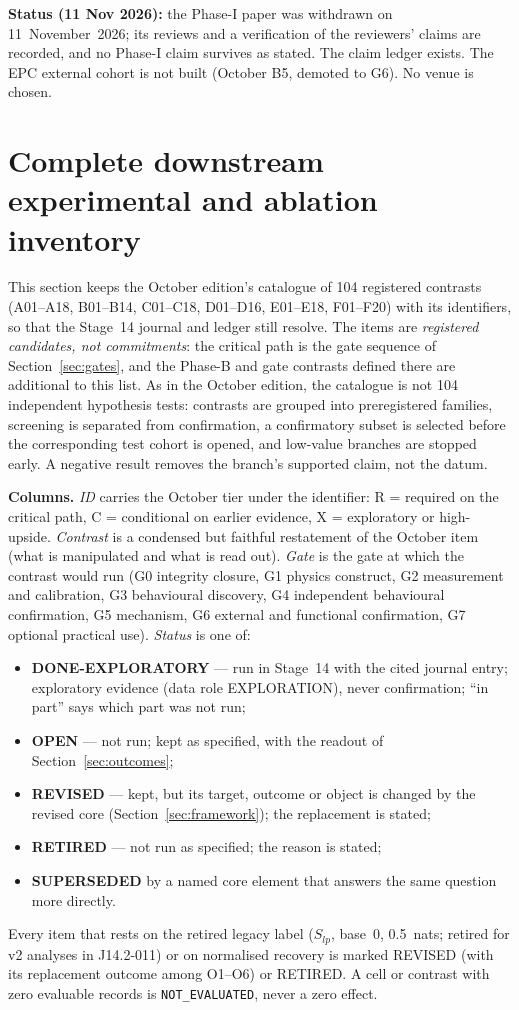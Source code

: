 \documentclass[10pt,a4paper]{article}
\newcommand{\NE}{\texttt{NOT\_EVALUATED}}
\begin{document}
\textbf{Status (11 Nov 2026):} the Phase-I paper was withdrawn on 11~November~2026; its reviews and a verification of
the reviewers' claims are recorded, and no Phase-I claim survives as stated. The claim ledger exists. The EPC
external cohort is not built (October B5, demoted to G6). No venue is chosen.

\section{Complete downstream experimental and ablation inventory}
\label{sec:inventory}

This section keeps the October edition's catalogue of 104 registered contrasts (A01--A18, B01--B14, C01--C18,
D01--D16, E01--E18, F01--F20) with its identifiers, so that the Stage~14 journal and ledger still resolve. The
items are \emph{registered candidates, not commitments}: the critical path is the gate sequence of
Section~\ref{sec:gates}, and the Phase-B and gate contrasts defined there are additional to this list. As in the
October edition, the catalogue is not 104 independent hypothesis tests: contrasts are grouped into
preregistered families, screening is separated from confirmation, a confirmatory subset is selected before the
corresponding test cohort is opened, and low-value branches are stopped early. A negative result removes the
branch's supported claim, not the datum.

\textbf{Columns.} \emph{ID} carries the October tier under the identifier: R = required on the critical path,
C = conditional on earlier evidence, X = exploratory or high-upside. \emph{Contrast} is a condensed but faithful
restatement of the October item (what is manipulated and what is read out). \emph{Gate} is the gate at which the
contrast would run (G0 integrity closure, G1 physics construct, G2 measurement and calibration, G3 behavioural
discovery, G4 independent behavioural confirmation, G5 mechanism, G6 external and functional confirmation, G7
optional practical use). \emph{Status} is one of:
\begin{itemize}
\item \textbf{DONE-EXPLORATORY} --- run in Stage~14 with the cited journal entry; exploratory evidence (data role
EXPLORATION), never confirmation; ``in part'' says which part was not run;
\item \textbf{OPEN} --- not run; kept as specified, with the readout of Section~\ref{sec:outcomes};
\item \textbf{REVISED} --- kept, but its target, outcome or object is changed by the revised core
(Section~\ref{sec:framework}); the replacement is stated;
\item \textbf{RETIRED} --- not run as specified; the reason is stated;
\item \textbf{SUPERSEDED} by a named core element that answers the same question more directly.
\end{itemize}
Every item that rests on the retired legacy label ($S_{lp}$, base~0, 0.5~nats; retired for v2 analyses in
J14.2-011) or on normalised recovery is marked REVISED (with its replacement outcome among O1--O6) or RETIRED.
A cell or contrast with zero evaluable records is \NE{}, never a zero effect.
\end{document}
